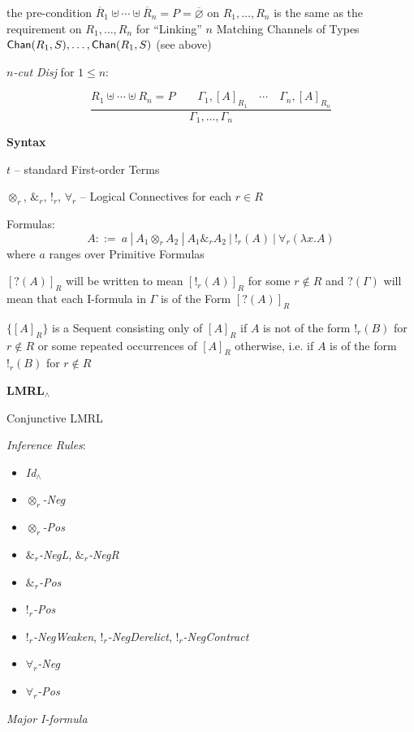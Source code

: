 the pre-condition $\overline{R}_1 \uplus \cdots \uplus \overline{R}_n
= P = \overline{\varnothing}$ on $R_1, \ldots, R_n$ is the same as the
requirement on $R_1, \ldots, R_n$ for ``Linking'' $n$ Matching
Channels of Types $\mathsf{Chan}(R_1,S), \ldots, \mathsf{Chan}(R_1,S)$ (see above)


\emph{$n$-cut Disj} for $1 \leq n$:

\[
  \frac{
    R_1 \uplus \cdots \uplus R_n = P \quad\quad
      \Gamma_1,[A]_{R_1} \quad \cdots \quad \Gamma_n,[A]_{R_n}
  }{
    \Gamma_1, \ldots, \Gamma_n
  }
\]


\textbf{Syntax}

$t$ -- standard First-order Terms

$\otimes_r$, $\&_r$, $!_r$, $\forall_r$ -- Logical Connectives for
each $r \in R$

Formulas:
\[
  A ::=\ a \ |\ A_1 \otimes_r A_2 \ |\ A_1 \&_r A_2 \ |\ !_r(A)
    \ |\ \forall_r(\lambda x.A)
\]
where $a$ ranges over Primitive Formulas

$[?(A)]_R$ will be written to mean $[!_r(A)]_R$ for some $r \notin R$
and $?(\Gamma)$ will mean that each I-formula in $\Gamma$ is of the
Form $[?(A)]_R$

$\{[A]_R\}$ is a Sequent consisting only of $[A]_R$ if $A$ is not of
the form $!_r(B)$ for $r \notin R$ or some repeated occurrences of
$[A]_R$ otherwise, i.e. if $A$ is of the form $!_r(B)$ for $r \notin
R$ %


\textbf{LMRL$_\wedge$}

Conjunctive LMRL

\emph{Inference Rules}:
\begin{itemize}
  \item \emph{Id$_\wedge$}
  \item \emph{$\otimes_r$-Neg}
  \item \emph{$\otimes_r$-Pos}
  \item \emph{$\&_r$-NegL}, \emph{$\&_r$-NegR}
  \item \emph{$\&_r$-Pos}
  \item \emph{$!_r$-Pos}
  \item \emph{$!_r$-NegWeaken}, \emph{$!_r$-NegDerelict},
    \emph{$!_r$-NegContract}
  \item \emph{$\forall_r$-Neg}
  \item \emph{$\forall_r$-Pos}
\end{itemize}

\emph{Major I-formula} %

